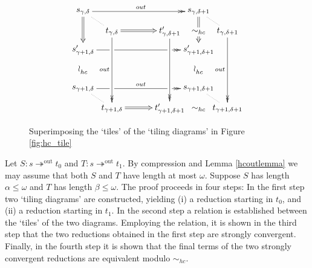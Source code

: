 \documentclass{LMCS}
\theoremstyle{plain}
\theoremstyle{definition}
\newcommand{\trewt}{\twoheadrightarrow}
\newcommand{\out}{\trewt^\mathrm{out}}
\newcommand{\simhc}{\sim_{hc}}
\newcommand{\simhcv}{\wr_{_{\scriptstyle hc}}}
\begin{document}
\begin{figure}
\[
\xymatrix@!0@C=1.2cm@R=0.8cm{
*+[gray]{s_{\gamma, \delta}} \ar@{->>}@[gray][rrrr]^[gray]{out}
                                \ar@{=>}@[gray][dd]
                                \ar@{.}[dr]
    & & &
    & *+[gray]{s_{\gamma, \delta + 1}} \ar@{=>}@[gray]'[d][dd]
                                          \ar@{.}[dr] \\
& t_{\gamma, \delta} \ar@{=>}[rr] \ar@{->>}[dddd]_{out}
    &
    & t'_{\gamma, \delta + 1} \ar@{->>}[dddd]
    & \simhc & t_{\gamma, \delta + 1} \ar@{->>}[dddd]_{out} \\
*+[gray]{s'_{\gamma + 1, \delta}} \ar@{->>}@[gray]'[r]'[rrr][rrrr]
    & & &
    & *+[gray]{s'_{\gamma + 1, \delta + 1}} \\
*[gray]{\simhcv}
    & & &
    & *[gray]{\simhcv} \\
*+[gray]{s_{\gamma + 1, \delta}}
                            \ar@{->>}@[gray]'[r]'[rrr]^[gray]{out}[rrrr]
                            \ar@{.}[dr]
    & & &
    & *+[gray]{s_{\gamma + 1, \delta + 1}} \ar@{.}[dr] \\
& t_{\gamma + 1, \delta} \ar@{=>}[rr]
    &
    & t'_{\gamma + 1, \delta + 1} & \simhc & t_{\gamma + 1, \delta + 1}
}
\]
\caption{\label{fig:hc_overlay}Superimposing the `tiles' of the `tiling diagrams' in Figure \ref{fig:hc_tile}}
\end{figure}

\proof
Let $S: s \out t_0$ and $T: s \out t_1$. By compression and Lemma \ref{hcoutlemma} we may assume that both $S$ and $T$ have length at most $\omega$. Suppose $S$ has length $\alpha \leq \omega$ and $T$ has length $\beta \leq \omega$. The proof proceeds in four steps: In the first step two `tiling diagrams' are constructed, yielding (i) a reduction starting in $t_0$, and (ii) a reduction starting in $t_1$. In the second step a relation is established between the `tiles' of the two diagrams. Employing the relation, it is shown in the third step that the two reductions obtained in the first step are strongly convergent. Finally, in the fourth step it is shown that the final terms of the two strongly convergent reductions are equivalent modulo $\simhc$. 
\end{document}
